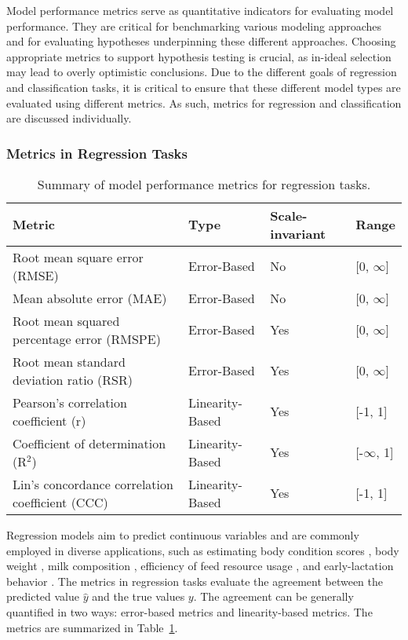 Model performance metrics serve as quantitative indicators for evaluating model performance. They are critical for benchmarking various modeling approaches and for evaluating hypotheses underpinning these different approaches. Choosing appropriate metrics to support hypothesis testing is crucial, as in-ideal selection may lead to overly optimistic conclusions. Due to the different goals of regression and classification tasks, it is critical to ensure that these different model types are evaluated using different metrics. As such, metrics for regression and classification are discussed individually.

\subsubsection{Metrics in Regression Tasks}

\begin{table}[H]
    \caption{Summary of model performance metrics for regression tasks.}
    \centering
    \begin{tabular}{llll}
        \toprule
        Metric & Type & Scale-invariant & Range \\
        \midrule
        Root mean square error (RMSE) & Error-Based & No & [0, $\infty$] \\
        Mean absolute error (MAE) & Error-Based & No & [0, $\infty$] \\
        Root mean squared percentage error (RMSPE) & Error-Based & Yes & [0, $\infty$] \\
        Root mean standard deviation ratio (RSR) & Error-Based & Yes & [0, $\infty$] \\
        Pearson's correlation coefficient (r) & Linearity-Based  & Yes & [-1, 1] \\
        Coefficient of determination (R$^2$) & Linearity-Based & Yes & [-$\infty$, 1] \\
        Lin's concordance correlation coefficient (CCC) & Linearity-Based & Yes & [-1, 1] \\
        \bottomrule
    \end{tabular}
    \label{tab:metrics-reg}
\end{table}

Regression models aim to predict continuous variables and are commonly employed in diverse applications, such as estimating body condition scores \citep{spoliansky_development_2016, yukun_automatic_2019}, body weight \citep{song_automated_2018,xavier_use_2022}, milk composition \citep{rovere_prediction_2021,mota_real-time_2022,mantysaari_body_2019,frizzarin_predicting_2021}, efficiency of feed resource usage \citep{grelet_potential_2020, appuhamy_prediction_2016,de_souza_predicting_2018}, and early-lactation behavior \citep{van_dixhoorn_indicators_2018}. The metrics in regression tasks evaluate the agreement between the predicted value $\hat{y}$ and the true values $y$. The agreement can be generally quantified in two ways: error-based metrics and linearity-based metrics. The metrics are summarized in Table~\ref{tab:metrics-reg}. 

